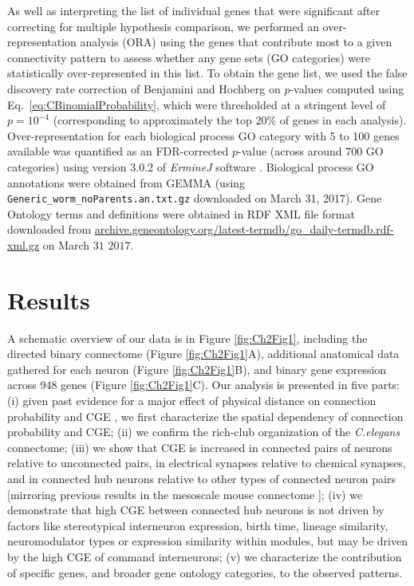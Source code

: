 As well as interpreting the list of individual genes that were significant after correcting for multiple hypothesis comparison, we performed an over-representation analysis (ORA) using the genes that contribute most to a given connectivity pattern to assess whether any gene sets (GO categories) were statistically over-represented in this list.
To obtain the gene list, we used the false discovery rate correction of Benjamini and Hochberg \citep{Benjamini1995} on $p$-values computed using Eq.~\eqref{eq:CBinomialProbability}, which were thresholded at a stringent level of $p = 10^{-4}$ (corresponding to approximately the top 20\% of genes in each analysis).
Over-representation for each biological process GO category with 5 to 100 genes available was quantified as an \mbox{FDR-corrected} $p$-value (across around 700 GO categories) using version 3.0.2 of \emph{ErmineJ} software \citep{Gillis2010}.
Biological process GO annotations \citep{Ashburner2000} were obtained from GEMMA \mbox{\citep{Zoubarev2012}} (using \texttt{Generic\_worm\_noParents.an.txt.gz} downloaded on March 31, 2017).
Gene Ontology terms and definitions were obtained in RDF XML file format downloaded from \mbox{\url{archive.geneontology.org/latest-termdb/go_daily-termdb.rdf-xml.gz}} on March $31$ $2017$.

\section{Results}

A schematic overview of our data is in Figure \ref{fig:Ch2Fig1}, including
the directed binary connectome (Figure \ref{fig:Ch2Fig1}A),
additional anatomical data gathered for each neuron (Figure \ref{fig:Ch2Fig1}B),
and binary gene expression across 948 genes (Figure \ref{fig:Ch2Fig1}C).
Our analysis is presented in five parts:
(i) given past evidence for a major effect of physical distance on connection probability and CGE  \citep{Fulcher2016}, we first characterize the spatial dependency of connection probability and CGE;
(ii) we confirm the rich-club organization of the \emph{C.elegans} connectome;
(iii) we show that CGE is increased in connected pairs of neurons relative to unconnected pairs, in electrical synapses relative to chemical synapses, and in connected hub neurons relative to other types of connected neuron pairs [mirroring previous results in the mesoscale mouse connectome \citep{Fulcher2016}];
(iv) we demonstrate that high CGE between connected hub neurons is not driven by factors like stereotypical interneuron expression, birth time, lineage similarity, neuromodulator types or expression similarity within modules, but may be driven by the high CGE of command interneurons;
(v) we characterize the contribution of specific genes, and broader gene ontology categories, to the observed patterns.

